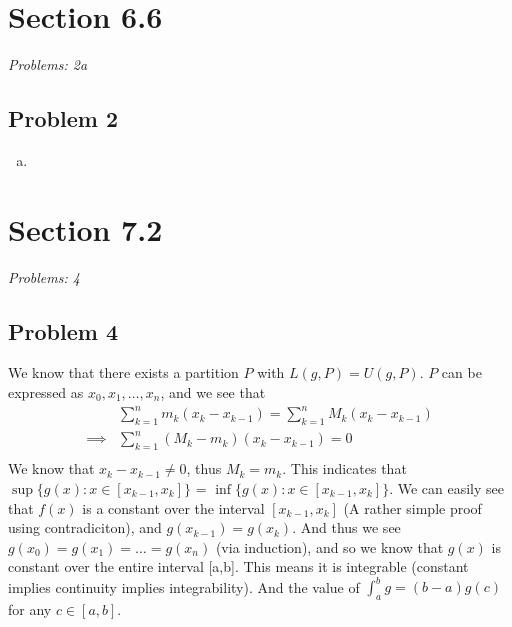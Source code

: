 \documentclass[12pt]{article}
\begin{document}
\vspace*{1cm}


\section*{Section 6.6}
\textit{Problems: 2a}

\subsection*{Problem 2}
\begin{enumerate}[a).]
    \item {
    }
\end{enumerate}


\vspace*{1cm}


\section*{Section 7.2}
\textit{Problems: 4}

\subsection*{Problem 4}
We know that there exists a partition $P$ with $L(g, P) = U(g,P)$. 
$P$ can be expressed as ${x_0, x_1, \dots, x_n}$, and we see that 
\begin{align*}
&\sum_{k=1}^{n}m_k(x_k - x_{k-1}) = \sum_{k=1}^{n}M_k(x_k - x_{k-1}) \\
\implies &\sum_{k=1}^{n}(M_k - m_k)(x_k - x_{k-1}) = 0\\
\end{align*}
We know that $x_{k} - x_{k-1} \ne 0$, thus $M_k = m_k$.
This indicates that $\sup \{g(x): x \in [x_{k-1}, x_{k}]\}$ = $\inf \{g(x): x \in [x_{k-1}, x_{k}]\}$. 
We can easily see that $f(x)$ is a constant over the interval $[x_{k-1}, x_k]$ (A rather simple proof using contradiciton), and $g(x_{k-1}) = g(x_k)$.
And thus we see $g(x_0) = g(x_1) = \dots = g(x_n)$ (via induction), and so we know that $g(x)$ is constant over the entire interval [a,b]. 
This means it is integrable (constant implies continuity implies integrability). 
And the value of $\int_{a}^{b}g = (b-a)g(c)$ for any $c \in [a,b]$. 
\end{document}
